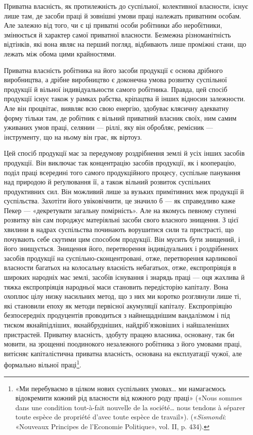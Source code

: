 Приватна власність, як протилежність до суспільної, колективної
власности, існує лише там, де засоби праці й зовнішні
умови праці належать приватним особам. Але залежно від того,
чи є ці приватні особи робітники або неробітники, змінюється
й характер самої приватної власности. Безмежна різноманітність
відтінків, які вона являє на перший погляд, відбивають лише
проміжні стани, що лежать між обома цими крайностями.

Приватна власність робітника на його засоби продукції є
основа дрібного виробництва, а дрібне виробництво є доконечна
умова розвитку суспільної продукції й вільної індивідуальности
самого робітника. Правда, цей спосіб продукції існує також у
рамках рабства, кріпацтва й інших відносин залежности. Але
він процвітає, виявляє всю свою енергію, здобуває клясичну
адекватну форму тільки там, де робітник є вільний приватний
власник своїх, ним самим уживаних умов праці, селянин — ріллі,
яку він обробляє, ремісник — інструменту, що на ньому він грає,
як віртоуз.

Цей спосіб продукції має за передумову роздрібнення землі
й усіх інших засобів продукції. Він виключає так концентрацію
засобів продукції, як і кооперацію, поділ праці всередині того
самого продукційного процесу, суспільне панування над природою
й реґулювання її, а також вільний розвиток суспільних продуктивних
сил. Він можливий лише за вузьких примітивних
меж продукції й суспільства. Захотіти його увіковічнити, це
значило б — як справедливо каже Пекер — «декретувати
загальну помірність». Але на якомусь певному ступені розвитку
він сам породжує матеріяльні засоби свого власного знищення.
З цієї хвилини в надрах суспільства починають ворушитися
сили та пристрасті, що почувають себе скутими цим способом
продукції. Він мусить бути знищений, і його знищується. Знищення
його, перетворення індивідуальних і роздрібнених засобів
продукції на суспільно-сконцентровані, отже, перетворення
карликової власности багатьох на колосальну власність
небагатьох, отже, експропріяція в широких народніх мас землі,
засобів існування і знарядь праці — оця жахлива й тяжка
експропріяція народньої маси становить передісторію капіталу.
Вона охоплює цілу низку насильних метод, що з них ми коротко
розглянули лише ті, які становили епоху як методи первісної
акумуляції капіталу. Експропріяцію безпосередніх продуцентів
проводиться з найнещаднішим вандалізмом і під тиском
якнайпідліших, якнайбрудніших, найдріб’язковіших і найшаленіших
пристрастей. Приватну власність, здобуту працею власника,
основану, так би мовити, на зрощенні поодинокого незалежного
робітника з його умовами праці, витісняє капіталістична
приватна власність, основана на експлуатації чужої, але формально
вільної праці\footnote{
«Ми перебуваємо в цілком нових суспільних умовах\dots{} ми намагаємось
відокремити кожний рід власности від кожного роду праці»
(«Nous sommes dans une condition tout-à-fait nouvelle de la société\dots{}
nous tendons à séparer toute espèce de propriété d’avec toute espèce de
travail»). («\emph{Sismondi}: «Nouveaux Principes de l’Economie Politique»,
vol. II, p. 434).
}.

